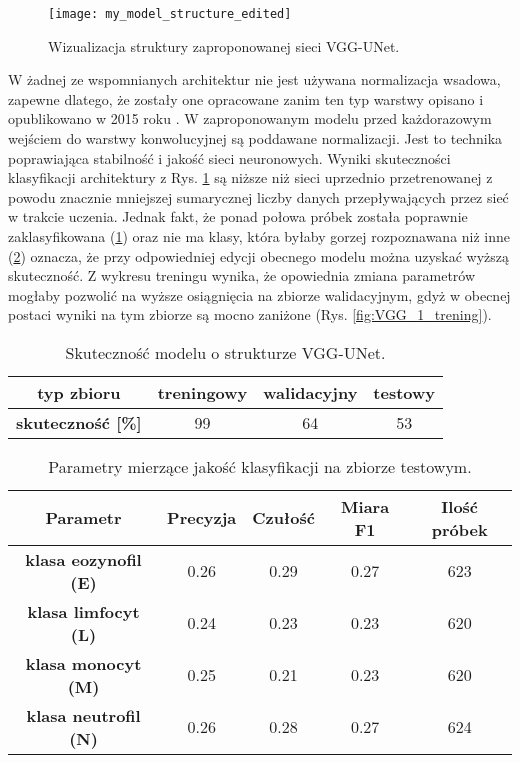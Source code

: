 \begin{figure}[h]
	\centering
	\centering
		\texttt{[image: my\_model\_structure\_edited]}	
	\caption{Wizualizacja struktury zaproponowanej sieci VGG-UNet.}
	\label{fig:ann_visualisation}
\end{figure}

{\parindent0pt
W żadnej ze wspomnianych architektur nie jest używana normalizacja wsadowa, zapewne dlatego, że zostały one opracowane zanim ten typ warstwy opisano i opublikowano w 2015 roku \cite{batch_normalisation}. W zaproponowanym modelu przed każdorazowym wejściem do warstwy konwolucyjnej są poddawane normalizacji. Jest to technika poprawiająca stabilność i jakość sieci neuronowych. Wyniki skuteczności klasyfikacji architektury z Rys. \ref{fig:ann_visualisation} są niższe niż sieci uprzednio przetrenowanej z powodu znacznie mniejszej sumarycznej liczby danych przepływających przez sieć w trakcie uczenia. Jednak fakt, że ponad połowa próbek została poprawnie zaklasyfikowana (\ref{tab:VGG_1_acc}) oraz nie ma klasy, która byłaby gorzej rozpoznawana niż inne (\ref{tab:VGG_1_params_val}) oznacza, że przy odpowiedniej edycji obecnego modelu można uzyskać wyższą skuteczność. Z wykresu treningu wynika, że opowiednia zmiana parametrów mogłaby pozwolić na wyższe osiągnięcia na zbiorze walidacyjnym, gdyż w obecnej postaci wyniki na tym zbiorze są mocno zaniżone (Rys. \ref{fig:VGG_1_trening}).

 \begin{table}[h!]
\centering
\caption[Short Heading]{Skuteczność modelu o strukturze VGG-UNet.}
\label{tab:VGG_1_acc}
\begin{tabular}{|c|c|c|c|}
\hline
\textbf{typ zbioru}           & \textbf{treningowy} & \textbf{walidacyjny} & \textbf{testowy} \\ \hline
\textbf{skuteczność {[}\%{]}} & 99                  & 64                   & 53               \\ \hline
\end{tabular}
\end{table}

\begin{table}[h!]
\centering
\caption[Short Heading]{Parametry mierzące jakość klasyfikacji na zbiorze testowym.}
\label{tab:VGG_1_params_val}
\begin{tabular}{|c|c|c|c|c|}
\hline
\textbf{Parametr}                               & \textbf{Precyzja} & \textbf{Czułość} & \textbf{Miara F1} & \textbf{Ilość próbek} \\ \hline
\textbf{klasa eozynofil (E)} & 0.26   & 0.29   & 0.27 & 623  \\ \hline
\textbf{klasa limfocyt (L)} & 0.24  & 0.23 & 0.23  & 620  \\ \hline
\textbf{klasa monocyt (M)} & 0.25   & 0.21    & 0.23  & 620  \\ \hline
\textbf{klasa neutrofil (N)} & 0.26   & 0.28    & 0.27  & 624  \\ \hline
\end{tabular}
\end{table}

}
